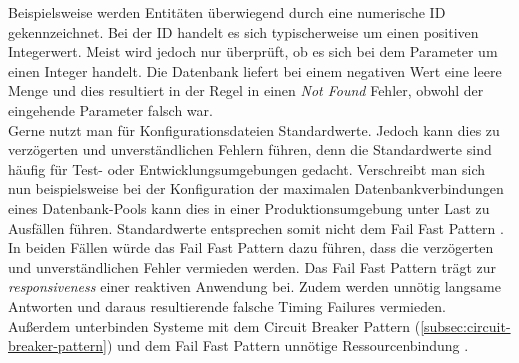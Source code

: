 Beispielsweise werden Entitäten überwiegend durch eine numerische ID gekennzeichnet. Bei der ID handelt es sich typischerweise um einen positiven Integerwert. Meist wird jedoch nur überprüft, ob es sich bei dem Parameter um einen Integer handelt. Die Datenbank liefert bei einem negativen Wert eine leere Menge und dies resultiert in der Regel in einen \textit{Not Found} Fehler, obwohl der eingehende Parameter falsch war.\\
Gerne nutzt man für Konfigurationsdateien Standardwerte. Jedoch kann dies zu verzögerten und unverständlichen Fehlern führen, denn die Standardwerte sind häufig für Test- oder Entwicklungsumgebungen gedacht. Verschreibt man sich nun beispielsweise bei der Konfiguration der maximalen Datenbankverbindungen eines Datenbank-Pools kann dies in einer Produktionsumgebung unter Last zu Ausfällen führen. Standardwerte entsprechen somit nicht dem Fail Fast Pattern \cite{shore_fail_2004}.\\

In beiden Fällen würde das Fail Fast Pattern dazu führen, dass die verzögerten und unverständlichen Fehler vermieden werden. Das Fail Fast Pattern trägt zur \textit{responsiveness} einer reaktiven Anwendung bei. Zudem werden unnötig langsame Antworten und daraus resultierende falsche Timing Failures vermieden. Außerdem unterbinden Systeme mit dem Circuit Breaker Pattern (\ref{subsec:circuit-breaker-pattern}) und dem Fail Fast Pattern unnötige Ressourcenbindung \cite[S.~107]{nygard_release_2007}.

\pagebreak

